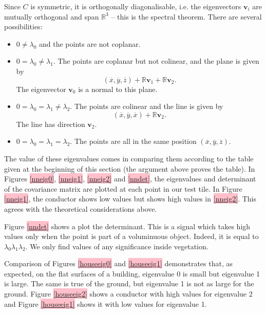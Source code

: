 \documentclass[a4paper,11pt,twoside]{article}
\theoremstyle{definition}
\theoremstyle{remark}
\newcommand{\sh}[1]{\colorbox{pink}{#1}}
\newcommand{\lnk}[1]{\sh{\hyperref[#1]{\ref*{#1}}}}
\begin{document}
Since $C$ is symmetric, it is orthogonally diagonalisable, i.e. the eigenvectors $\textbf{v}_i$ are mutually orthogonal and span $\mathbb{R}^3$ -- this is the spectral theorem. There are several possibilities:
\begin{itemize}
\item $0\neq\lambda_0$ and the points are not coplanar.
\item $0=\lambda_0\neq \lambda_1$. The points are coplanar but not colinear, and the plane is given by 
\begin{displaymath}
(\overline x,\overline y,\overline z)+\mathbb{R}\textbf{v}_1+\mathbb{R}\textbf{v}_2.
\end{displaymath}
The eigenvector $\textbf{v}_0$ is a normal to this plane.
\item $0=\lambda_0=\lambda_1\neq\lambda_2$. The points are colinear and the line is given by
\begin{displaymath}
(\overline x,\overline y,\overline x)+\mathbb{R}\textbf{v}_2.
\end{displaymath}
The line has direction $\textbf{v}_2$.
\item $0=\lambda_0=\lambda_1=\lambda_2$. The points are all in the same position $(\overline x,\overline y,\overline z)$.
\end{itemize}
The value of these eigenvalues comes in comparing them according to the table given at the beginning of this section (the argument above proves the table). In Figures \lnk{nneig0}, \lnk{nneig1}, \lnk{nneig2} and \lnk{nndet}, the eigenvalues and determinant of the covariance matrix are plotted at each point in our test tile. In Figure \lnk{nneig1}, the conductor shows low values but shows high values in \lnk{nneig2}. This agrees with the theoretical considerations above. 

Figure \lnk{nndet} shows a plot the determinant. This is a signal which takes high values only when the point is part of a voluminuous object. Indeed, it is equal to $\lambda_0\lambda_1\lambda_2$. We only find values of any significance inside vegetation.

Comparison of Figures \lnk{houseeig0} and \lnk{houseeig1} demonstrates that, as expected, on the flat surfaces of a building, eigenvalue 0 is small but eigenvalue 1 is large. The same is true of the ground, but eigenvalue 1 is not as large for the ground. Figure \lnk{houseeig2} shows a conductor with high values for eigenvalue 2 and Figure \lnk{houseeig1} shows it with low values for eigenvalue 1.
\end{document}
